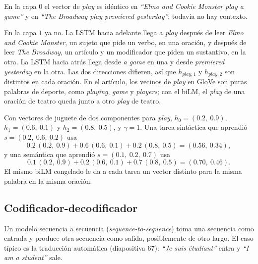 \documentclass[11pt,letterpaper]{article}
\begin{document}
\begin{ejemplo}
    En la capa $0$ el vector de \textit{play} es idéntico en
    \textit{``Elmo and Cookie Monster play a game''} y en \textit{``The
    Broadway play premiered yesterday''}: todavía no hay contexto.

    En la capa $1$ ya no. La LSTM hacia adelante llega a
    \textit{play} después de leer \textit{Elmo and Cookie Monster}, un
    sujeto que pide un verbo, en una oración, y después de leer
    \textit{The Broadway}, un artículo y un modificador que piden un
    sustantivo, en la otra. La LSTM hacia atrás llega desde \textit{a
    game} en una y desde \textit{premiered yesterday} en la otra. Las
    dos direcciones difieren, así que $h_{\textit{play},1}$ y
    $h_{\textit{play},2}$ son distintos en cada oración. En el
    artículo, los vecinos de \textit{play} en GloVe son puras palabras
    de deporte, como \textit{playing}, \textit{game} y
    \textit{players}; con el biLM, el \textit{play} de una oración de
    teatro queda junto a otro \textit{play} de teatro.
\end{ejemplo}

\begin{ejemplo}
    Con vectores de juguete de dos componentes para \textit{play},
    $h_0 = (0.2,\ 0.9)$, $h_1 = (0.6,\ 0.1)$ y $h_2 = (0.8,\ 0.5)$, y
    $\gamma = 1$. Una tarea sintáctica que aprendió
    $s = (0.2,\ 0.6,\ 0.2)$ usa
    \[
        0.2\,(0.2,\ 0.9) + 0.6\,(0.6,\ 0.1) + 0.2\,(0.8,\ 0.5)
        = (0.56,\ 0.34) ,
    \]
    y una semántica que aprendió $s = (0.1,\ 0.2,\ 0.7)$ usa
    \[
        0.1\,(0.2,\ 0.9) + 0.2\,(0.6,\ 0.1) + 0.7\,(0.8,\ 0.5)
        = (0.70,\ 0.46) .
    \]
    El mismo biLM congelado le da a cada tarea un vector distinto
    para la misma palabra en la misma oración.
\end{ejemplo}


\subsection*{Codificador-decodificador}

Un modelo secuencia a secuencia (\textit{sequence-to-sequence}) toma
una secuencia como entrada y produce otra secuencia como salida,
posiblemente de otro largo. El caso típico es la traducción automática
(diapositiva $67$): \textit{``Je suis étudiant''} entra y
\textit{``I am a student''} sale.
\end{document}
